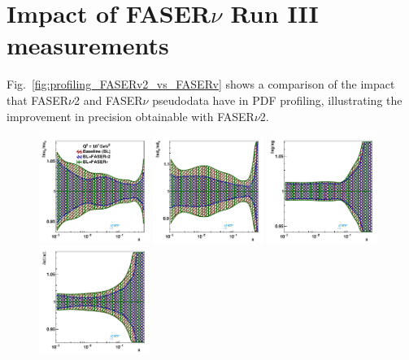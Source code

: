 \section{Impact of FASER$\nu$ Run III measurements}
\label{app:fasernu_runIII_impact}


%
Fig.~\ref{fig:profiling_FASERv2_vs_FASERv} shows a comparison of the impact 
that FASER$\nu$2 and FASER$\nu$ pseudodata have in PDF profiling, illustrating 
the improvement in precision obtainable with FASER$\nu$2.

\begin{figure}[t]
\centering
\includegraphics[width=0.32\textwidth]{plots/proton_fasernu2/FASERv2_vs_FASERv/statOnly_FASERv_q2_10000_pdf_uv_ratio.pdf}
\includegraphics[width=0.32\textwidth]{plots/proton_fasernu2/FASERv2_vs_FASERv/statOnly_FASERv_q2_10000_pdf_dv_ratio.pdf}
\includegraphics[width=0.32\textwidth]{plots/proton_fasernu2/FASERv2_vs_FASERv/statOnly_FASERv_q2_10000_pdf_g_ratio.pdf}\\
\includegraphics[width=0.32\textwidth]{plots/proton_fasernu2/FASERv2_vs_FASERv/statOnly_FASERv_q2_10000_pdf_Sea_ratio.pdf}

\end{figure}
